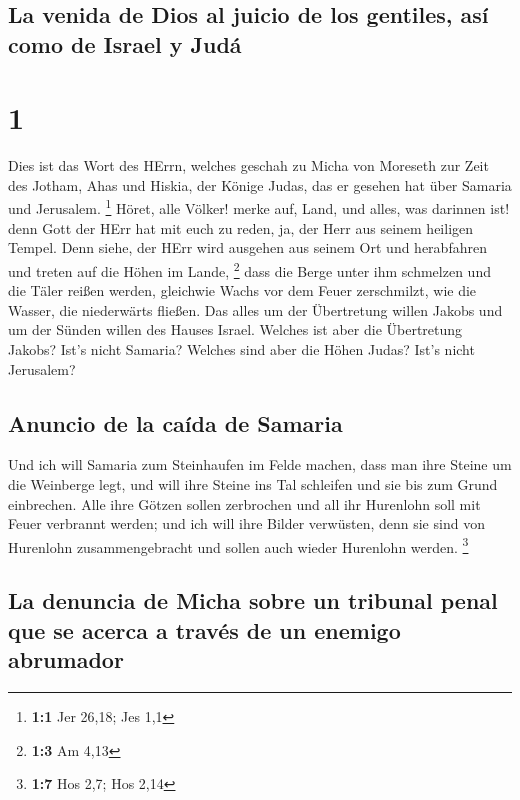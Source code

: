 \hypertarget{la-venida-de-dios-al-juicio-de-los-gentiles-asuxed-como-de-israel-y-juduxe1}{%
\subsection{La venida de Dios al juicio de los gentiles, así como de
Israel y
Judá}\label{la-venida-de-dios-al-juicio-de-los-gentiles-asuxed-como-de-israel-y-juduxe1}}

\hypertarget{section}{%
\section{1}\label{section}}

 Dies ist das Wort des HErrn, welches geschah zu Micha von
Moreseth zur Zeit des Jotham, Ahas und Hiskia, der Könige Judas, das er
gesehen hat über Samaria und Jerusalem. \footnote{\textbf{1:1} Jer
  26,18; Jes 1,1}  Höret, alle Völker! merke auf, Land,
und alles, was darinnen ist! denn Gott der HErr hat mit euch zu reden,
ja, der Herr aus seinem heiligen Tempel.  Denn siehe, der
HErr wird ausgehen aus seinem Ort und herabfahren und treten auf die
Höhen im Lande, \footnote{\textbf{1:3} Am 4,13}  dass die
Berge unter ihm schmelzen und die Täler reißen werden, gleichwie Wachs
vor dem Feuer zerschmilzt, wie die Wasser, die niederwärts fließen.
 Das alles um der Übertretung willen Jakobs und um der
Sünden willen des Hauses Israel. Welches ist aber die Übertretung
Jakobs? Ist's nicht Samaria? Welches sind aber die Höhen Judas? Ist's
nicht Jerusalem?

\hypertarget{anuncio-de-la-cauxedda-de-samaria}{%
\subsection{Anuncio de la caída de
Samaria}\label{anuncio-de-la-cauxedda-de-samaria}}

 Und ich will Samaria zum Steinhaufen im Felde machen,
dass man ihre Steine um die Weinberge legt, und will ihre Steine ins Tal
schleifen und sie bis zum Grund einbrechen.  Alle ihre
Götzen sollen zerbrochen und all ihr Hurenlohn soll mit Feuer verbrannt
werden; und ich will ihre Bilder verwüsten, denn sie sind von Hurenlohn
zusammengebracht und sollen auch wieder Hurenlohn werden. \footnote{\textbf{1:7}
  Hos 2,7; Hos 2,14}

\hypertarget{la-denuncia-de-micha-sobre-un-tribunal-penal-que-se-acerca-a-travuxe9s-de-un-enemigo-abrumador}{%
\subsection{La denuncia de Micha sobre un tribunal penal que se acerca a
través de un enemigo
abrumador}\label{la-denuncia-de-micha-sobre-un-tribunal-penal-que-se-acerca-a-travuxe9s-de-un-enemigo-abrumador}}

